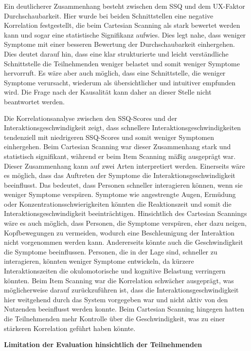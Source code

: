 Ein deutlicherer Zusammenhang besteht zwischen dem SSQ und dem UX-Faktor Durchschaubarkeit. Hier wurde bei beiden Schnittstellen eine negative Korrelation festgestellt, die beim Cartesian Scanning als stark bewertet werden kann und sogar eine statistische Signifikanz aufwies. Dies legt nahe, dass weniger Symptome mit einer besseren Bewertung der Durchschaubarkeit einhergehen. Dies deutet darauf hin, dass eine klar strukturierte und leicht verständliche Schnittstelle die Teilnehmenden weniger belastet und somit weniger Symptome hervorruft. Es wäre aber auch möglich, dass eine Schnittstelle, die weniger Symptome verursacht, wiederum als übersichtlicher und intuitiver empfunden wird. Die Frage nach der Kausalität kann daher an dieser Stelle nicht beantwortet werden. 

Die Korrelationsanalyse zwischen den SSQ-Scores und der Interaktionsgeschwindigkeit zeigt, dass schnellere Interaktionsgeschwindigkeiten tendenziell mit niedrigeren SSQ-Scores und somit weniger Symptomen einhergehen. Beim Cartesian Scanning war dieser Zusammenhang stark und statistisch signifikant, während er beim Item Scanning mäßig ausgeprägt war. Dieser Zusammenhang kann auf zwei Arten interpretiert werden. Einerseits wäre es möglich, dass das Auftreten der Symptome die Interaktionsgeschwindigkeit beeinflusst. Das bedeutet, dass Personen schneller interagieren können, wenn sie weniger Symptome verspüren. Symptome wie angestrengte Augen, Ermüdung oder Konzentrationsschwierigkeiten könnten die Reaktionszeit und somit die Interaktionsgeschwindigkeit beeinträchtigen. Hinsichtlich des Cartesian Scannings wäre es auch möglich, dass Personen, die Symptome verspüren, eher dazu neigen, Kopfbewegungen zu vermeiden, wodurch eine Beschleunigung der Interaktion nicht vorgenommen werden kann. Andererseits könnte auch die Geschwindigkeit die Symptome beeinflussen. Personen, die in der Lage sind, schneller zu interagieren, könnten weniger Symptome entwickeln, da kürzere Interaktionszeiten die okulomotorische und kognitive Belastung verringern könnten.
Beim Item Scanning war die Korrelation schwächer ausgeprägt, was möglicherweise darauf zurückzuführen ist, dass die Interaktionsgeschwindigkeit hier weitgehend durch das System vorgegeben war und nicht aktiv von den Nutzenden beeinflusst werden konnte. Beim Cartesian Scanning hingegen hatten die Teilnehmenden mehr Kontrolle über die Geschwindigkeit, was zu einer stärkeren Korrelation geführt haben könnte.

\textbf{Limitation der Evaluation hinsichtlich der Teilnehmenden}

